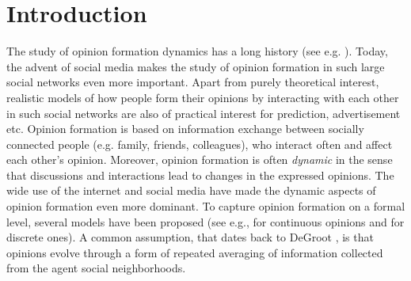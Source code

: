 \section{Introduction}


The study of opinion formation dynamics has a long history (see e.g.
\cite{Jackson}).  Today, the advent of social media makes the study of opinion
formation in such large social networks even more important.  Apart from purely
theoretical interest, realistic models of how people form their opinions by
interacting with each other in such social networks are also of practical
interest for prediction, advertisement etc.  Opinion formation is based on
information exchange between socially connected people (e.g. family, friends,
colleagues), who interact often and affect each other's opinion.  Moreover,
opinion formation is often \emph{dynamic} in the sense that discussions and
interactions lead to changes in the expressed opinions. The wide use of the
internet and social media have made the dynamic aspects of opinion formation
even more dominant.  To capture opinion formation on a formal level, several
models have been proposed (see e.g., \cite{DeGroot,FJ90,HK,BKO11} for
continuous opinions and \cite{FGV12,YOASS13,BFM16} for discrete ones).  A
common assumption, that dates back to DeGroot \cite{DeGroot}, is that opinions
evolve through a form of repeated averaging of information collected from the
agent social neighborhoods.

